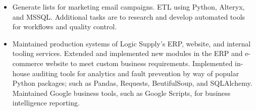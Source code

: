 \documentclass[10pt,a4paper]{altacv}
\begin{document}

\begin{fullwidth}
\makecvheader
\end{fullwidth}


\begin{itemize}
\item Generate lists for marketing email campaigns. ETL using Python, Alteryx, and MSSQL. Additional tasks are to research and develop
automated tools for workflows and quality control.
\end{itemize}

\divider

\begin{itemize}
\item Maintained production systems of Logic Supply's ERP, website, and internal tooling
services. Extended and implemented new modules in the ERP and e-commerce website to meet custom business requirements.
Implemented in-house auditing tools for analytics and fault prevention by way of popular Python packages; such as Pandas, Requests, BeutifulSoup, and SQLAlchemy.
Maintained Google business tools, such as Google Scripts, for business intelligence reporting.
\end{itemize}
\end{document}
